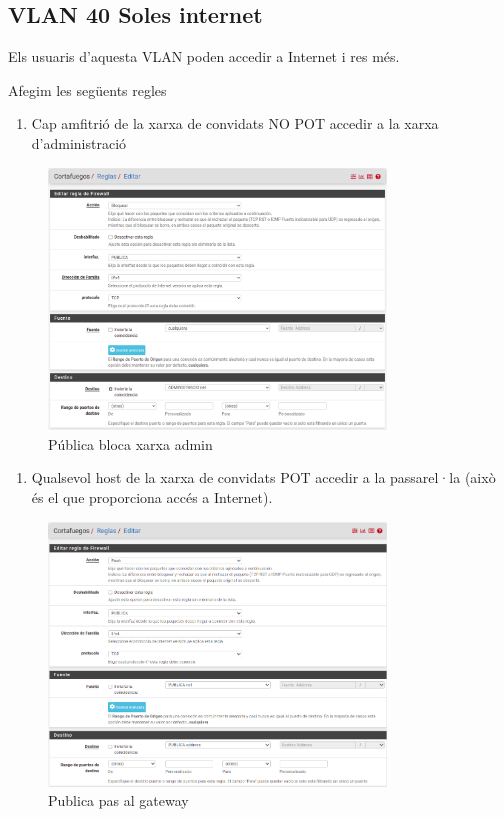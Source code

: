 \documentclass[
  10pt,
]{krantz}
\providecommand{\tightlist}{%
  \setlength{\itemsep}{0pt}\setlength{\parskip}{0pt}}
\begin{document}
\hypertarget{vlan-40-soles-internet}{%
\subsection{VLAN 40 Soles internet}\label{vlan-40-soles-internet}}

Els usuaris d'aquesta VLAN poden accedir a Internet i res més.

Afegim les següents regles

\begin{enumerate}
\def\labelenumi{\arabic{enumi}.}
\tightlist
\item
  Cap amfitrió de la xarxa de convidats NO POT accedir a la xarxa d'administració
\end{enumerate}

\begin{figure}
\centering
\includegraphics[width=0.8\textwidth,height=\textheight]{imatges/proxmox/publica_no_admin.png}
\caption{Pública bloca xarxa admin}
\end{figure}

\begin{enumerate}
\def\labelenumi{\arabic{enumi}.}
\setcounter{enumi}{1}
\tightlist
\item
  Qualsevol host de la xarxa de convidats POT accedir a la passarel·la (això és el que proporciona accés a Internet).
\end{enumerate}

\begin{figure}
\centering
\includegraphics[width=0.8\textwidth,height=\textheight]{imatges/proxmox/publica_regla1.png}
\caption{Publica pas al gateway}
\end{figure}
\end{document}
